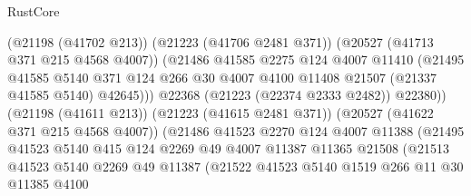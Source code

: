 \begin{lexlean}{RustCore}
\begin{coremodule}
                                  (@21198 (@41702 @213))
                                  (@21223 (@41706 @2481 @371))
                                  (@20527 (@41713 @371 @215 @4568 @4007))
                                  (@21486
                                    @41585
                                    @2275
                                    @124
                                    @4007
                                    @11410
                                    (@21495
                                      @41585
                                      @5140
                                      @371
                                      @124
                                      @266
                                      @30
                                      @4007
                                      @4100
                                      @11408
                                      @21507
                                      (@21337 @41585 @5140)
                                      @42645)))
                                @22368
                                (@21223 (@22374 @2333 @2482))
                                @22380))
                            (@21198 (@41611 @213))
                            (@21223 (@41615 @2481 @371))
                            (@20527 (@41622 @371 @215 @4568 @4007))
                            (@21486
                              @41523
                              @2270
                              @124
                              @4007
                              @11388
                              (@21495
                                @41523
                                @5140
                                @415
                                @124
                                @2269
                                @49
                                @4007
                                @11387
                                @11365
                                @21508
                                (@21513
                                  @41523
                                  @5140
                                  @2269
                                  @49
                                  @11387
                                  (@21522
                                    @41523
                                    @5140
                                    @1519
                                    @266
                                    @11
                                    @30
                                    @11385
                                    @4100

\end{coremodule}
\end{lexlean}
